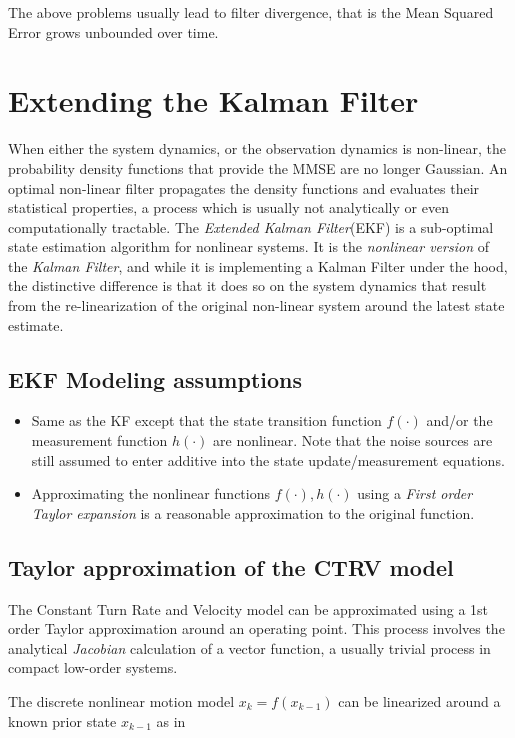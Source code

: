 The above problems usually lead to filter divergence, that is the Mean Squared Error grows unbounded over time.

\section{Extending the Kalman Filter}

When either the system dynamics, or the observation dynamics is non-linear, the probability density functions that provide the MMSE are no longer Gaussian. An optimal non-linear filter propagates the density functions and evaluates their statistical properties, a process which is usually not analytically or even computationally tractable. The \emph{Extended Kalman Filter}(EKF) is a sub-optimal state estimation algorithm for nonlinear systems. It is the \emph{nonlinear version} of the \emph{Kalman Filter}, and while it is implementing a Kalman Filter under the hood, the distinctive difference is that it does so on the system dynamics that result from the re-linearization of the original non-linear system around the latest state estimate.
\subsection{EKF Modeling assumptions}

\begin{itemize}
	\item Same as the KF except that the state transition function $f(\cdot)$ and/or the measurement function $h(\cdot)$ are nonlinear. Note that the noise sources are still assumed to enter additive into the state update/measurement equations.
	\item Approximating the nonlinear functions $f(\cdot),h(\cdot)$ using a  \emph{First order Taylor expansion} is a reasonable approximation to the original function.
\end{itemize}

\subsection{Taylor approximation of the CTRV model}

The Constant Turn Rate and Velocity model can be approximated using a 1st order Taylor approximation around an operating point. This process involves the analytical \emph{Jacobian} calculation of a vector function, a usually trivial process in compact low-order systems.


The discrete nonlinear motion model $x_{k} = f({x}_{k-1})$ can be linearized around a known prior state $x_{k-1}$ as in 




